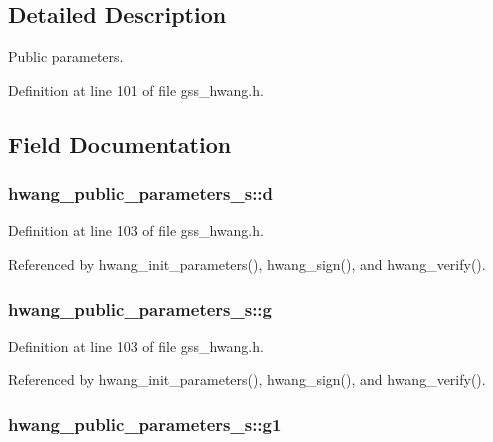 \subsection{Detailed Description}
Public parameters. 



Definition at line 101 of file gss\-\_\-hwang.\-h.



\subsection{Field Documentation}
\hypertarget{structhwang__public__parameters__s_a6c8fe1d87171daef20ce0aaae0f7ff25}{
\subsubsection[{d}]{ hwang\-\_\-public\-\_\-parameters\-\_\-s\-::d}}\label{structhwang__public__parameters__s_a6c8fe1d87171daef20ce0aaae0f7ff25}


Definition at line 103 of file gss\-\_\-hwang.\-h.



Referenced by hwang\-\_\-init\-\_\-parameters(), hwang\-\_\-sign(), and hwang\-\_\-verify().

\hypertarget{structhwang__public__parameters__s_afe1b1377dbf0af80e02e3e4c0fe5549e}{
\subsubsection[{g}]{ hwang\-\_\-public\-\_\-parameters\-\_\-s\-::g}}\label{structhwang__public__parameters__s_afe1b1377dbf0af80e02e3e4c0fe5549e}


Definition at line 103 of file gss\-\_\-hwang.\-h.



Referenced by hwang\-\_\-init\-\_\-parameters(), hwang\-\_\-sign(), and hwang\-\_\-verify().

\hypertarget{structhwang__public__parameters__s_a6f2de41c1643791479b70080f64d6840}{
\subsubsection[{g1}]{ hwang\-\_\-public\-\_\-parameters\-\_\-s\-::g1}}\label{structhwang__public__parameters__s_a6f2de41c1643791479b70080f64d6840}


